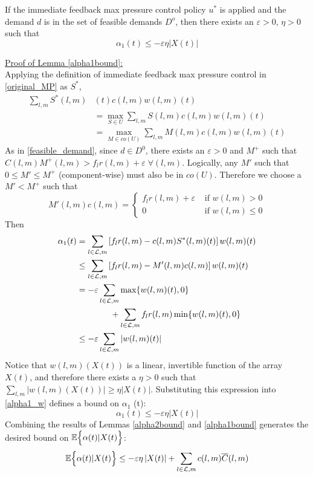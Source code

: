  \begin{Lem} \label{alpha1bound}
If the immediate feedback max pressure control policy $u^*$ is applied and the demand $d$ is in the set of feasible demands $D^o$, then there exists an $\varepsilon>0$, $\eta>0$ such that 
\begin{equation} 
\alpha_1(t)  \leq -\varepsilon \eta \big| X(t)\big| 
\end{equation}
\end{Lem}
\underline{Proof of Lemma \ref{alpha1bound}:} \\
Applying the definition of immediate feedback max pressure control in \eqref{original_MP} as $S^*$, 
\begin{align*}
\sum_{l,m} S^* (l,m)&(t) c(l,m) w(l,m)(t) \\
&= \max_{S\in U} \sum_{l,m} S(l,m)c(l,m)w(l,m)(t) \\
&= \max_{M\in co(U)} \sum_{l,m} M(l,m)c(l,m)w(l,m)(t)
\end{align*}
As in \eqref{feasible_demand}, since $d\in D^0$, there exists an $\varepsilon > 0$ and $M^+$ such that $C(l,m)M^+(l,m) > f_l r(l,m) + \varepsilon \; \forall (l,m)$. Logically, any $M'$ such that $0\leq M' \leq M^+$ (component-wise) must also be in $co(U)$. Therefore we choose a $M' < M^+$ such that 
\begin{equation} \label{epsDef}
M'(l,m) c(l,m) = \begin{cases} 
f_l r(l,m) + \varepsilon  & \text{ if } w(l,m)>0 \\
0 & \text{ if }w(l,m)\leq 0
\end{cases}
\end{equation} 
 Then
 \begin{align} %
\nonumber  \alpha_1 (t) & =  \sum_{l \in \linkset,m} \left[ f_l r(l,m) - c(l,m)S^*(l,m)(t) \right] w(l,m)(t) \\
 \nonumber & \leq \sum_{l \in \linkset,m} \left[ f_l r(l,m) - M'(l,m)c(l,m) \right] w(l,m)(t) \\
\nonumber & = -\varepsilon \sum_{l \in \linkset,m} \max\{w(l,m)(t),0\} \\
\nonumber & \qquad \qquad +  \sum_{l \in \linkset,m}  f_l r(l,m)  \min\{ w(l,m)(t),0\} \\
& \leq -\varepsilon \sum_{l \in \linkset,m}  \left| w(l,m) (t) \right| \label{alpha1_w}
\end{align}
Notice that $w(l,m)(X(t))$ is a linear, invertible function of the array $X(t)$, and therefore there exists a $\eta >0$ such that $\sum_{l,m} | w(l,m) (X(t)) | \geq \eta |X(t)|$. Substituting this expression into \eqref{alpha1_w} defines a bound on $\alpha_1$ (t): 
\begin{equation} \label{a1_bound_eq}
\alpha_1(t) \leq -\varepsilon \eta \left| X(t ) \right|
\end{equation}
Combining the results of Lemmas \ref{alpha2bound} and \ref{alpha1bound} generates the desired bound on $\mathbb{E}\Big\{ \alpha (t) | X(t) \Big\}$:
\begin{equation}\label{alphabound}
\expectation{\alpha(t) | X(t)} \leq -\varepsilon \eta \left| X(t ) \right| + \sum_{l \in \linkset,m} c(l,m)\overline{C} (l,m)
\end{equation}

